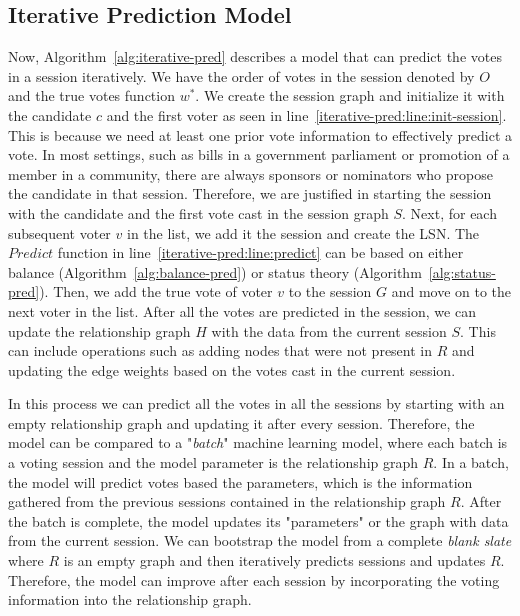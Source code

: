 \subsection{Iterative Prediction Model}

Now, Algorithm~\ref{alg:iterative-pred} describes a model that can predict the votes in a session iteratively.
We have the order of votes in the session denoted by $O$ and the true votes function $w^{*}$.
We create the session graph and initialize it with the candidate $c$ and the first voter as seen in line~\ref{iterative-pred:line:init-session}.
This is because we need at least one prior vote information to effectively predict a vote.
In most settings, such as bills in a government parliament or promotion of a member in a community, there are always  sponsors or nominators who propose the candidate in that session.
Therefore, we are justified in starting the session with the candidate and the first vote cast in the session graph $S$.
Next, for each subsequent voter $v$ in the list, we add it the session and create the LSN.
The $Predict$ function in line~\ref{iterative-pred:line:predict} can be based on either balance (Algorithm~\ref{alg:balance-pred}) or status theory (Algorithm~\ref{alg:status-pred}).
Then, we add the true vote of voter $v$ to the session $G$ and move on to the next voter in the list.
After all the votes are predicted in the session, we can update the relationship graph $H$ with the data from the current session $S$.
This can include operations such as adding nodes that were not present in $R$ and updating the edge weights based on the votes cast in the current session.

In this process we can predict all the votes in all the sessions by starting with an empty relationship graph and updating it after every session.
Therefore, the model can be compared to a "\textit{batch}" machine learning model, where each batch is a voting session and the model parameter is the relationship graph $R$.
In a batch, the model will predict votes based the parameters, which is the information gathered from the previous sessions contained in the relationship graph $R$.
After the batch is complete, the model updates its "parameters" or the graph with data from the current session.
We can bootstrap the model from a complete \textit{blank slate} where $R$ is an empty graph and then iteratively predicts sessions and updates $R$.
Therefore, the model can improve after each session by incorporating the voting information into the relationship graph.

